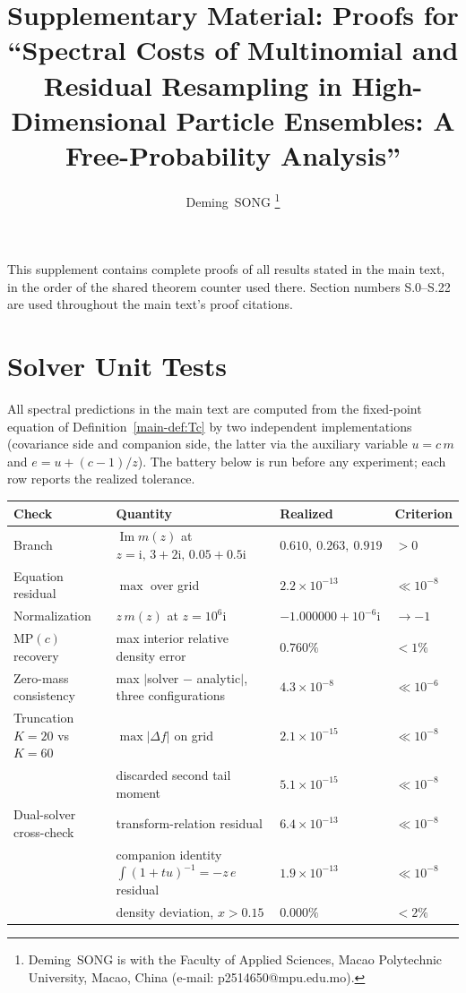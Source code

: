 \documentclass[10pt,onecolumn]{IEEEtran}
\title{Supplementary Material: Proofs for ``Spectral Costs of Multinomial and Residual Resampling in High-Dimensional Particle Ensembles: A Free-Probability Analysis''}
\author{Deming~SONG%
\thanks{Deming~SONG is with the Faculty of Applied Sciences, Macao Polytechnic University, Macao, China (e-mail: p2514650@mpu.edu.mo).}}
\theoremstyle{remark}
\begin{document}
\maketitle

\IEEEpeerreviewmaketitle

This supplement contains complete proofs of all results stated in the main text, in the order of the shared theorem counter used there. Section numbers S.0--S.22 are used throughout the main text's proof citations.

\setcounter{section}{-1}
\renewcommand{\thesection}{S.\arabic{section}}


\section{Solver Unit Tests}\label{sec:S23}

All spectral predictions in the main text are computed from the fixed-point
equation of Definition~\ref{main-def:Tc} by two independent implementations (covariance side
and companion side, the latter via the auxiliary variable $u=c\,m$ and
$e=u+(c-1)/z$). The battery below is run before any experiment; each row
reports the realized tolerance.

\begin{center}
\renewcommand{\arraystretch}{1.25}
\begin{tabular}{llll}
\toprule
Check & Quantity & Realized & Criterion \\
\midrule
Branch & $\operatorname{Im}m(z)$ at $z=\mathrm{i},\,3+2\mathrm{i},\,0.05+0.5\mathrm{i}$
  & $0.610,\ 0.263,\ 0.919$ & $>0$ \\
Equation residual & $\max$ over grid & $2.2\times10^{-13}$ & $\ll 10^{-8}$ \\
Normalization & $z\,m(z)$ at $z=10^{6}\mathrm{i}$ & $-1.000000+10^{-6}\mathrm{i}$ & $\to-1$ \\
$\mathrm{MP}(c)$ recovery & max interior relative density error & $0.760\%$ & $<1\%$ \\
Zero-mass consistency & max $|$solver $-$ analytic$|$, three configurations
  & $4.3\times10^{-8}$ & $\ll10^{-6}$ \\
Truncation $K{=}20$ vs $K{=}60$ & $\max|\Delta f|$ on grid & $2.1\times10^{-15}$ & $\ll10^{-8}$ \\
 & discarded second tail moment & $5.1\times10^{-15}$ & $\ll10^{-8}$ \\
Dual-solver cross-check & transform-relation residual & $6.4\times10^{-13}$ & $\ll10^{-8}$ \\
 & companion identity $\int(1+tu)^{-1}=-z\,e$ residual & $1.9\times10^{-13}$ & $\ll10^{-8}$ \\
 & density deviation, $x>0.15$ & $0.000\%$ & $<2\%$ \\
\bottomrule
\end{tabular}
\end{center}
\end{document}
